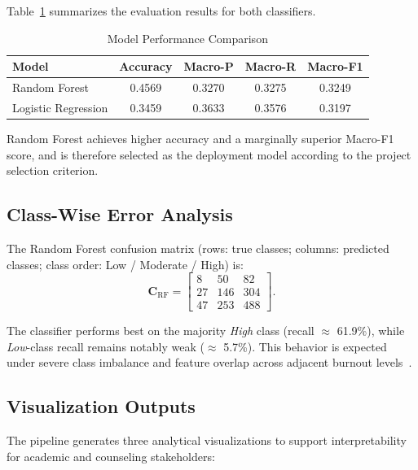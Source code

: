 \documentclass[conference]{IEEEtran}
\begin{document}
Table~\ref{tab:performance} summarizes the evaluation results for both classifiers.

\begin{table}[htbp]
\caption{Model Performance Comparison}
\label{tab:performance}
\centering
\begin{tabular}{@{}lcccc@{}}
\toprule
\textbf{Model} & \textbf{Accuracy} & \textbf{Macro-P} & \textbf{Macro-R} & \textbf{Macro-F1} \\
\midrule
Random Forest       & 0.4569 & 0.3270 & 0.3275 & 0.3249 \\
Logistic Regression & 0.3459 & 0.3633 & 0.3576 & 0.3197 \\
\bottomrule
\end{tabular}
\end{table}

Random Forest achieves higher accuracy and a marginally superior Macro-F1 score, and is therefore selected as the deployment model according to the project selection criterion.

\subsection{Class-Wise Error Analysis}

The Random Forest confusion matrix (rows: true classes; columns: predicted classes; class order: Low / Moderate / High) is:
\begin{equation}
\mathbf{C}_{\text{RF}} =
\begin{bmatrix}
  8  &  50 &  82 \\
 27  & 146 & 304 \\
 47  & 253 & 488
\end{bmatrix}.
\label{eq:confusion_matrix}
\end{equation}

The classifier performs best on the majority \textit{High} class (recall $\approx$ 61.9\%), while \textit{Low}-class recall remains notably weak ($\approx$ 5.7\%). This behavior is expected under severe class imbalance and feature overlap across adjacent burnout levels~\cite{imbalance_learning}.

\subsection{Visualization Outputs}

The pipeline generates three analytical visualizations to support interpretability for academic and counseling stakeholders:
\end{document}
